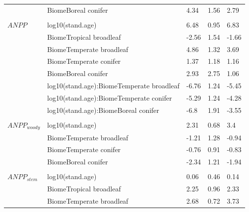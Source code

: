 \documentclass[
]{article}
\begin{document}
\begin{longtable}{lllll}
\hspace{1em} & BiomeBoreal conifer & 4.34 & 1.56 & 2.79\\
\addlinespace[1em]
\multicolumn{4}{l}{\textbf{}}\\
\hspace{1em}$ANPP$ & log10(stand.age) & 6.48 & 0.95 & 6.83\\
\hspace{1em} & BiomeTropical broadleaf & -2.56 & 1.54 & -1.66\\
\hspace{1em} & BiomeTemperate broadleaf & 4.86 & 1.32 & 3.69\\
\hspace{1em} & BiomeTemperate conifer & 1.37 & 1.18 & 1.16\\
\hspace{1em} & BiomeBoreal conifer & 2.93 & 2.75 & 1.06\\
\hspace{1em} & log10(stand.age):BiomeTemperate broadleaf & -6.76 & 1.24 & -5.45\\
\hspace{1em} & log10(stand.age):BiomeTemperate conifer & -5.29 & 1.24 & -4.28\\
\hspace{1em} & log10(stand.age):BiomeBoreal conifer & -6.8 & 1.91 & -3.55\\
\addlinespace[1em]
\multicolumn{4}{l}{\textbf{}}\\
\hspace{1em}$ANPP_{woody}$ & log10(stand.age) & 2.31 & 0.68 & 3.4\\
\hspace{1em} & BiomeTemperate broadleaf & -1.21 & 1.28 & -0.94\\
\hspace{1em} & BiomeTemperate conifer & -0.76 & 0.91 & -0.83\\
\hspace{1em} & BiomeBoreal conifer & -2.34 & 1.21 & -1.94\\
\addlinespace[1em]
\multicolumn{4}{l}{\textbf{}}\\
\hspace{1em}$ANPP_{stem}$ & log10(stand.age) & 0.06 & 0.46 & 0.14\\
\hspace{1em} & BiomeTropical broadleaf & 2.25 & 0.96 & 2.33\\
\hspace{1em} & BiomeTemperate broadleaf & 2.68 & 0.72 & 3.73\\

\end{longtable}
\end{document}
